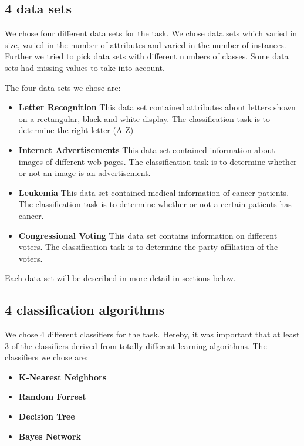 \documentclass{sig-alternate-05-2015}
\begin{document}
\subsection{4 data sets}
We chose four different data sets for the task. We chose data sets which varied in size, varied in the number of attributes and varied in the number of instances. Further we tried to pick data sets with different numbers of classes. Some data sets had missing values to take into account.

The four data sets we chose are:

\begin{itemize}
\item \textbf{Letter Recognition}
This data set contained attributes about letters shown on a rectangular, black and white display. The classification task is to determine the right letter (A-Z)
\item \textbf{Internet Advertisements}
This data set contained information about images of different web pages. The classification task is to determine whether or not an image is an advertisement.
\item \textbf{Leukemia}
This data set contained medical information of cancer patients. The classification task is to determine whether or not a certain patients has cancer.
\item \textbf{Congressional Voting}
This data set contains information on different voters. The classification task is to determine the party affiliation of the voters.
\end{itemize}

Each data set will be described in more detail in sections below.


\subsection{4 classification algorithms}
We chose 4 different classifiers for the task. Hereby, it was important that at least 3 of the classifiers derived from totally different learning algorithms. The classifiers we chose are:

\begin{itemize}
\item \textbf{K-Nearest Neighbors}
\item \textbf{Random Forrest}
\item \textbf{Decision Tree}
\item \textbf{Bayes Network}
\end{itemize}
\end{document}
